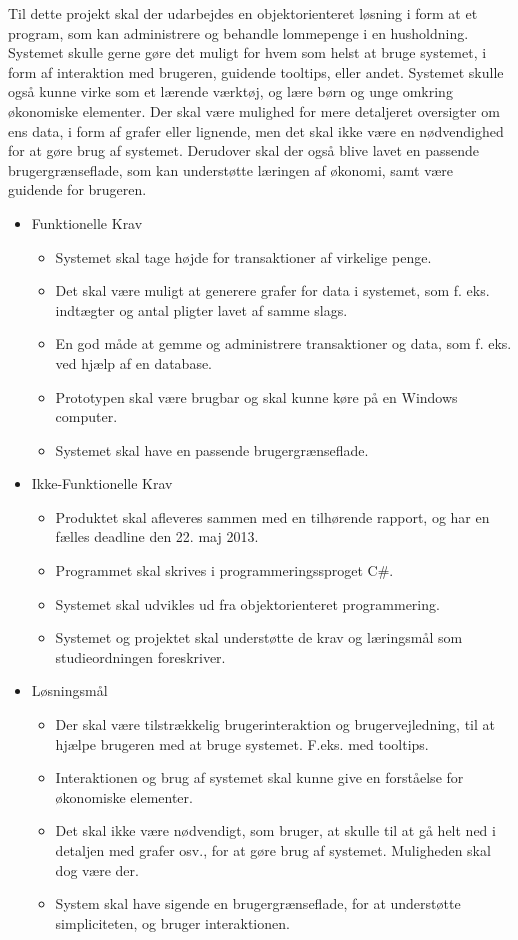 Til dette projekt skal der udarbejdes en objektorienteret løsning i form at et program, som kan administrere og behandle lommepenge i en husholdning. Systemet skulle gerne gøre det muligt for hvem som helst at bruge systemet, i form af interaktion med brugeren, guidende tooltips, eller andet. Systemet skulle også kunne virke som et lærende værktøj, og lære børn og unge omkring økonomiske elementer. Der skal være mulighed for mere detaljeret oversigter om ens data, i form af grafer eller lignende, men det skal ikke være en nødvendighed for at gøre brug af systemet. Derudover skal der også blive lavet en passende brugergrænseflade, som kan understøtte læringen af økonomi, samt være guidende for brugeren.

\begin{itemize}
	\item Funktionelle Krav
	\begin{itemize}
		\item Systemet skal tage højde for transaktioner af virkelige penge.
		\item Det skal være muligt at generere grafer for data i systemet, som f. eks. indtægter og antal pligter lavet af samme slags.
		\item En god måde at gemme og administrere transaktioner og data, som f. eks. ved hjælp af en database.
		\item Prototypen skal være brugbar og skal kunne køre på en Windows computer.
		\item Systemet skal have en passende brugergrænseflade.
	\end{itemize}
	\item Ikke-Funktionelle Krav
	\begin{itemize}
		\item Produktet skal afleveres sammen med en tilhørende rapport, og har en fælles deadline den 22. maj 2013.
		\item Programmet skal skrives i programmeringssproget C#.
		\item Systemet skal udvikles ud fra objektorienteret programmering.
		\item Systemet og projektet skal understøtte de krav og læringsmål som studieordningen foreskriver.
	\end{itemize}
	\item Løsningsmål
	\begin{itemize}
		\item Der skal være tilstrækkelig brugerinteraktion og brugervejledning, til at hjælpe brugeren med at bruge systemet. F.eks. med tooltips.
		\item Interaktionen og brug af systemet skal kunne give en forståelse for økonomiske elementer.
		\item Det skal ikke være nødvendigt, som bruger, at skulle til at gå helt ned i detaljen med grafer osv., for at gøre brug af systemet. Muligheden skal dog være der.
		\item System skal have sigende en brugergrænseflade, for at understøtte simpliciteten, og bruger interaktionen.
	\end{itemize}
\end{itemize}